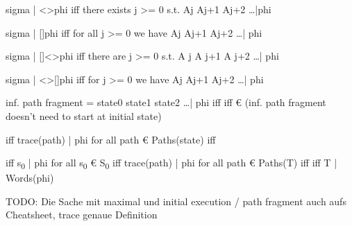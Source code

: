 \documentclass[landscape, a4paper]{article}
\begin{document}
\begin{minipage}[t]{0.19\linewidth}
\begin{betterlist}
		\item sigma |\raisebox{0.5mm}{=} <>phi iff there exists j >= 0 s.t. Aj Aj+1 Aj+2 \ldots |\raisebox{0.5mm}{=}phi
		\item sigma |\raisebox{0.5mm}{=} []phi iff for all j >= 0 we have Aj Aj+1 Aj+2 \ldots |\raisebox{0.5mm}{=} phi
		\item sigma |\raisebox{0.5mm}{=} []<>phi iff there are  j >= 0 s.t. A j A j+1 A j+2 \ldots |\raisebox{0.5mm}{=} phi
		\item sigma |\raisebox{0.5mm}{=} <>[]phi iff for  j >= 0 we have Aj Aj+1 Aj+2 \ldots |\raisebox{0.5mm}{=} phi
    \item inf. path fragment = state0 state1 state2  \ldots |\raisebox{0.4mm}{=} phi iff \raisebox{0.4mm}{=}  iff €  (inf. path fragment doesn't need to start at initial state)
    \item {}\raisebox{0.4mm}{=}  iff trace(path) |\raisebox{0.4mm}{=} phi for all path € Paths(state) iff \raisebox{0.3mm}{=} 
    \item {}\raisebox{0.4mm}{=}  iff s\textsubscript{0} |\raisebox{0.4mm}{=} phi for all s\textsubscript{0} € S\textsubscript{0} iff trace(path) |\raisebox{0.4mm}{=} phi for all path € Paths(T) iff \raisebox{0.3mm}{=} iff T |\raisebox{0.4mm}{=} Words(phi)
    \item TODO: Die Sache mit maximal und initial execution / path fragment auch aufs Cheatsheet, trace genaue Definition
	\end{betterlist}
\end{minipage}
\end{document}
